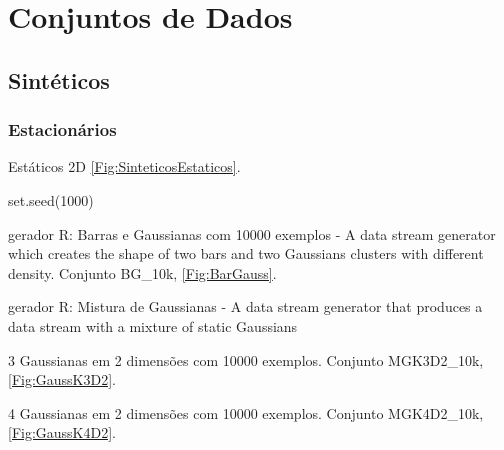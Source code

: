 \section{Conjuntos de Dados}

\subsection{Sintéticos}

\subsubsection*{Estacionários}

Estáticos 2D \autoref{Fig:SinteticosEstaticos}.

set.seed(1000)

gerador R: Barras e Gaussianas com 10000 exemplos - A data stream generator which creates the shape of two bars and two Gaussians clusters with different density. Conjunto BG\_10k, \autoref{Fig:BarGauss}.

gerador R: Mistura de Gaussianas - A data stream generator that produces a data stream with a mixture of static Gaussians

3 Gaussianas em 2 dimensões com 10000 exemplos. Conjunto MGK3D2\_10k, \autoref{Fig:GaussK3D2}.

4 Gaussianas em 2 dimensões com 10000 exemplos. Conjunto MGK4D2\_10k, \autoref{Fig:GaussK4D2}.

